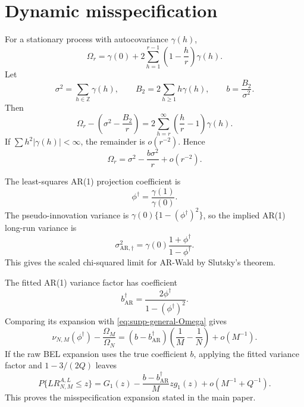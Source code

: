 \documentclass[12pt]{article}
\theoremstyle{remark}
\begin{document}
\section{Dynamic misspecification}
\label{supp:misspec}
For a stationary process with autocovariance $\gamma(h)$,
\[
\Omega_r=\gamma(0)+2\sum_{h=1}^{r-1}\left(1-\frac hr\right)\gamma(h).
\]
Let
\[
\sigma^2=\sum_{h\in\mathbb Z}\gamma(h),
\qquad
B_2=2\sum_{h\ge1}h\gamma(h),
\qquad
b=\frac{B_2}{\sigma^2}.
\]
Then
\[
\Omega_r-\left(\sigma^2-\frac{B_2}{r}\right)
=2\sum_{h=r}^\infty\left(\frac hr-1\right)\gamma(h).
\]
If $\sum h^2|\gamma(h)|<\infty$, the remainder is $o(r^{-2})$. Hence
\begin{equation}
\Omega_r=\sigma^2-\frac{b\sigma^2}{r}+o(r^{-2}).
\label{eq:supp-general-Omega}
\end{equation}

The least-squares AR(1) projection coefficient is
\[
\phi^\dagger=\frac{\gamma(1)}{\gamma(0)}.
\]
The pseudo-innovation variance is $\gamma(0)\{1-(\phi^\dagger)^2\}$, so the implied AR(1) long-run variance is
\begin{equation*}
\sigma^2_{\mathrm{AR},\dagger}
=\gamma(0)\frac{1+\phi^\dagger}{1-\phi^\dagger}.
\end{equation*}
This gives the scaled chi-squared limit for AR-Wald by Slutsky's theorem.

The fitted AR(1) variance factor has coefficient
\[
b_{\mathrm{AR}}^\dagger=\frac{2\phi^\dagger}{1-(\phi^\dagger)^2}.
\]
Comparing its expansion with \eqref{eq:supp-general-Omega} gives
\begin{equation*}
\nu_{N,M}(\phi^\dagger)-\frac{\Omega_M}{\Omega_N}
=(b-b_{\mathrm{AR}}^\dagger)\left(\frac1M-\frac1N\right)+o(M^{-1}).
\end{equation*}
If the raw BEL expansion uses the true coefficient $b$, applying the fitted variance factor and $1-3/(2Q)$ leaves
\begin{equation*}
P\{LR^{A,L}_{N,M}\le z\}
=G_1(z)-\frac{b-b_{\mathrm{AR}}^\dagger}{M}zg_1(z)
+o(M^{-1}+Q^{-1}).
\end{equation*}
This proves the misspecification expansion stated in the main paper.
\end{document}
